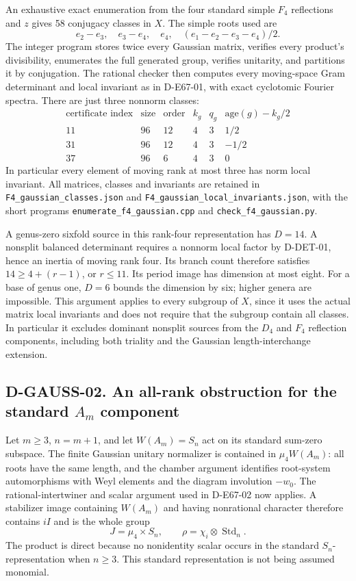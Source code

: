 An exhaustive exact enumeration from the four standard simple \(F_4\)
reflections and \(z\) gives 58 conjugacy classes in \(X\).
The simple roots used are
\[
 e_2-e_3,\quad e_3-e_4,\quad e_4,\quad
                   (e_1-e_2-e_3-e_4)/2.
\]
The integer program stores twice every Gaussian matrix, verifies every
product's divisibility, enumerates the full generated group, verifies
unitarity, and partitions it by conjugation. The rational checker then
computes every moving-space Gram determinant and local invariant as in
D-E67-01, with exact cyclotomic Fourier spectra. There are just three
nonnorm classes:
\[
\begin{array}{c|c|c|c|c|c}
 \text{certificate index}&\text{size}&\text{order}&k_g&q_g&
                       \text{age}(g)-k_g/2\\\hline
11&96&12&4&3&1/2\\
31&96&12&4&3&-1/2\\
37&96&6&4&3&0
\end{array}
\]
In particular every element of moving rank at most three has norm local
invariant. All matrices, classes and invariants are retained in
\texttt{F4\_gaussian\_classes.json} and
\texttt{F4\_gaussian\_local\_invariants.json}, with the short
programs \texttt{enumerate\_f4\_gaussian.cpp} and
\texttt{check\_f4\_gaussian.py}.

A genus-zero sixfold source in this rank-four representation has
\(D=14\). A nonsplit balanced determinant requires a nonnorm local
factor by D-DET-01, hence an inertia of moving rank four. Its branch
count therefore satisfies \(14\ge4+(r-1)\), or \(r\le11\).
Its period image has dimension at most eight. For a base of genus
one, \(D=6\) bounds the dimension by six; higher genera are impossible.
This argument applies to every subgroup of \(X\), since it uses the
actual matrix local invariants and does not require that the subgroup
contain all classes. In particular it excludes dominant nonsplit
sources from the \(D_4\) and \(F_4\) reflection components, including
both triality and the Gaussian length-interchange extension.

\subsection*{D-GAUSS-02. An all-rank obstruction for the standard \(A_m\) component}

Let \(m\ge3\), \(n=m+1\), and let \(W(A_m)=S_n\) act on its
standard sum-zero subspace. The finite Gaussian unitary normalizer is
contained in \(\mu_4W(A_m)\): all roots have the same length, and
the chamber argument identifies root-system automorphisms with Weyl
elements and the diagram involution \(-w_0\). The rational-intertwiner
and scalar argument used in D-E67-02 now applies. A stabilizer image
containing \(W(A_m)\) and having nonrational character therefore
contains \(iI\) and is the whole group
\[
                J=\mu_4\times S_n,\qquad
                \rho=\chi_i\otimes\operatorname{Std}_n.
\]
The product is direct because no nonidentity scalar occurs in the
standard \(S_n\)-representation when \(n\ge3\).
This standard representation is not being assumed monomial.

